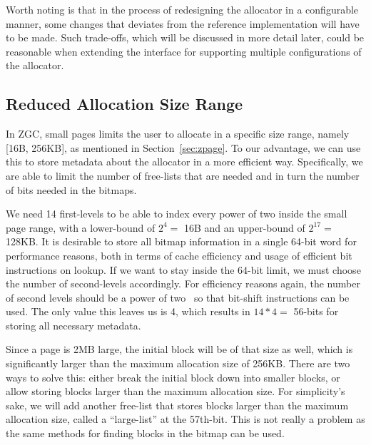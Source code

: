 Worth noting is that in the process of redesigning the allocator in a configurable manner, some changes that deviates from the reference implementation will have to be made. Such trade-offs, which will be discussed in more detail later, could be reasonable when extending the interface for supporting multiple configurations of the allocator.

\subsection{Reduced Allocation Size Range}
\label{sec:adaptations:reduced_allocation_range}

In ZGC, small pages limits the user to allocate in a specific size range, namely [16B, 256KB], as mentioned in Section~\ref{sec:zpage}. To our advantage, we can use this to store metadata about the allocator in a more efficient way. Specifically, we are able to limit the number of free-lists that are needed and in turn the number of bits needed in the bitmaps.

We need 14 first-levels to be able to index every power of two inside the small page range, with a lower-bound of $2^4 =$ 16B and an upper-bound of $2^{17} =$ 128KB. It is desirable to store all bitmap information in a single 64-bit word for performance reasons, both in terms of cache efficiency and usage of efficient bit instructions on lookup. If we want to stay inside the 64-bit limit, we must choose the number of second-levels accordingly. For efficiency reasons again, the number of second levels should be a power of two~\cite{TLSF} so that bit-shift instructions can be used. The only value this leaves us is 4, which results in $14 * 4 =$ 56-bits for storing all necessary metadata.

Since a page is 2MB large, the initial block will be of that size as well, which is significantly larger than the maximum allocation size of 256KB. There are two ways to solve this: either break the initial block down into smaller blocks, or allow storing blocks larger than the maximum allocation size. For simplicity's sake, we will add another free-list that stores blocks larger than the maximum allocation size, called a ``large-list'' at the 57th-bit. This is not really a problem as the same methods for finding blocks in the bitmap can be used.

